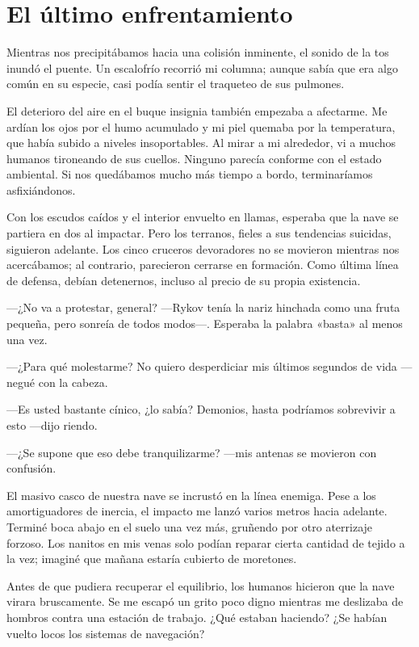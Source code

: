 \chapter{El último enfrentamiento}\label{sec:el-ultimo-enfrentamiento}

Mientras nos precipitábamos hacia una colisión inminente, el sonido de la tos inundó el puente. Un escalofrío recorrió mi columna; aunque sabía que era algo común en su especie, casi podía sentir el traqueteo de sus pulmones.

El deterioro del aire en el buque insignia también empezaba a afectarme. Me ardían los ojos por el humo acumulado y mi piel quemaba por la temperatura, que había subido a niveles insoportables. Al mirar a mi alrededor, vi a muchos humanos tironeando de sus cuellos. Ninguno parecía conforme con el estado ambiental. Si nos quedábamos mucho más tiempo a bordo, terminaríamos asfixiándonos.

Con los escudos caídos y el interior envuelto en llamas, esperaba que la nave se partiera en dos al impactar. Pero los terranos, fieles a sus tendencias suicidas, siguieron adelante. Los cinco cruceros devoradores no se movieron mientras nos acercábamos; al contrario, parecieron cerrarse en formación. Como última línea de defensa, debían detenernos, incluso al precio de su propia existencia.

 —¿No va a protestar, general? —Rykov tenía la nariz hinchada como una fruta pequeña, pero sonreía de todos modos—. Esperaba la palabra «basta» al menos una vez.

—¿Para qué molestarme? No quiero desperdiciar mis últimos segundos de vida —negué con la cabeza.

—Es usted bastante cínico, ¿lo sabía? Demonios, hasta podríamos sobrevivir a esto —dijo riendo.

 —¿Se supone que eso debe tranquilizarme? —mis antenas se movieron con confusión.

El masivo casco de nuestra nave se incrustó en la línea enemiga. Pese a los amortiguadores de inercia, el impacto me lanzó varios metros hacia adelante. Terminé boca abajo en el suelo una vez más, gruñendo por otro aterrizaje forzoso. Los nanitos en mis venas solo podían reparar cierta cantidad de tejido a la vez; imaginé que mañana estaría cubierto de moretones.

Antes de que pudiera recuperar el equilibrio, los humanos hicieron que la nave virara bruscamente. Se me escapó un grito poco digno mientras me deslizaba de hombros contra una estación de trabajo. ¿Qué estaban haciendo? ¿Se habían vuelto locos los sistemas de navegación?

